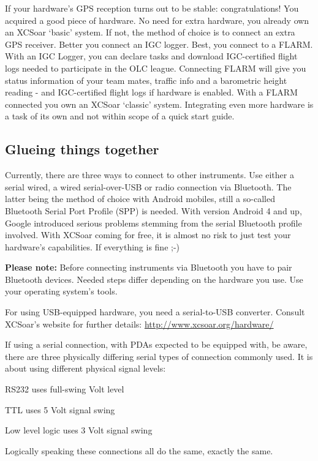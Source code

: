 \documentclass[english,a4paper,12pt]{refrep}
\begin{document}
If your hardware's GPS reception turns out to be stable: congratulations! You 
acquired a good piece of hardware. No need for extra hardware, you already own 
an XCSoar `basic' system. If not, the method of choice is to connect an extra 
GPS receiver. Better you connect an IGC logger. Best, you connect to a FLARM.
With an IGC Logger, you can declare tasks and download IGC-certified flight 
logs needed to participate in the OLC league.
Connecting FLARM will give you status information of your team mates,
traffic info and a barometric height reading - and IGC-certified flight 
logs if hardware is enabled.
With a FLARM connected you own an XCSoar `classic' system.  Integrating even
more hardware is a task of its own and not within scope of a quick start guide. 

\subsection{\textcolor{flashblue}{Glueing things together}}
Currently, there are three ways to connect to other instruments.  Use either
a serial wired, a wired serial-over-USB or radio connection via Bluetooth. The
latter being the method of choice with Android mobiles, still a so-called
Bluetooth Serial Port Profile (SPP) is needed. With version Android 4 and up,
Google introduced serious problems stemming from the serial Bluetooth profile
involved. With XCSoar coming for free, it is almost no risk to just test your 
hardware's capabilities. If everything is fine ;-)

\textbf{Please note:} Before connecting instruments via Bluetooth you have to
pair Bluetooth devices. Needed steps differ depending on the hardware you use.
Use your operating system's tools.

For using USB-equipped hardware, you need a serial-to-USB converter. Consult 
XCSoar's website for further details: {\url{http://www.xcsoar.org/hardware/}}

If using a serial connection, with PDAs expected to be equipped with, be 
aware, there are three physically differing serial types of connection 
commonly used. It is about using different physical signal levels:

\begin{compactitem}
\item RS232 uses full-swing  Volt level
\item TTL uses 5 Volt signal swing
\item Low level logic uses 3 Volt signal swing
\end{compactitem}
Logically speaking these connections all do the same, exactly the
same.
\end{document}
